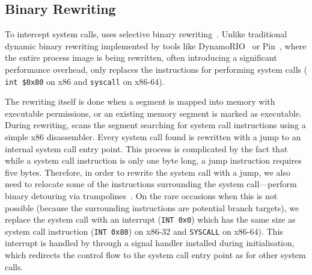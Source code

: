 \subsection{Binary Rewriting}
\label{sec:rewriting}


To intercept system calls, \varan uses selective binary
rewriting~\cite{bird}. Unlike traditional dynamic binary rewriting
implemented by tools like DynamoRIO~\cite{dynamorio02} or
Pin~\cite{pin05}, where the entire process image is being rewritten,
often introducing a significant performance overhead, \varan only
replaces the instructions for performing system calls (\ie
\lstinline[language={[x64]Assembler}]`int $0x80` on x86 and
\lstinline[language={[x64]Assembler}]`syscall` on x86-64).

The rewriting itself is done when a segment is mapped into memory with
executable permissions, or an existing memory segment is marked as
executable.  
During rewriting, \varan scans the segment searching for system call
instructions using a simple x86 disassembler.  Every system call found
is rewritten with a jump to an internal system call entry point. This
process is complicated by the fact that while a system call
instruction is only one byte long, a jump instruction requires five
bytes.  Therefore, in order to rewrite the system call with a jump, we
also need to relocate some of the instructions surrounding the system
call---\ie perform binary detouring via trampolines~\cite{detours}.
On the rare occasions when this is not possible (\eg because the
surrounding instructions are potential branch targets), we replace the
system call with an interrupt (\ie \lstinline`INT 0x0`) which has the
same size as system call instruction (\ie \lstinline`INT 0x80`) on
x86-32 and \lstinline`SYSCALL` on x86-64).  This interrupt is handled by
\varan through a signal handler installed during initialisation, which
redirects the control flow to the system call entry point as for other
system calls.

